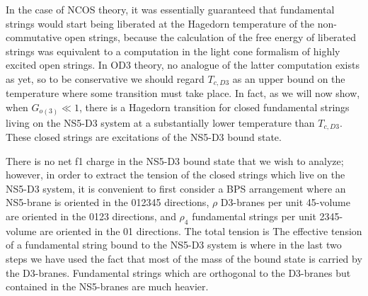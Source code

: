 In the case of NCOS theory, it was essentially guaranteed that
fundamental strings would start being liberated at the Hagedorn
temperature of the non-commutative open strings, because the
calculation of the free energy of liberated strings was equivalent to
a computation in the light cone formalism of highly excited open
strings.  In OD3 theory, no analogue of the latter computation exists
as yet, so to be conservative we should regard $T_{c,D3}$ as an upper
bound on the temperature where some transition must take place.  In
fact, as we will now show, when $G_{o(3)} \ll 1$, there is a Hagedorn
transition for closed fundamental strings living on the NS5-D3 system
at a substantially lower temperature than $T_{c,D3}$.  These closed
strings are excitations of the NS5-D3 bound state.  

There is no net f1 charge in the NS5-D3 bound state that we wish to
analyze; however, in order to extract the tension of the closed
strings which live on the NS5-D3 system, it is convenient to first
consider a BPS arrangement where an NS5-brane is oriented in the
012345 directions, $\rho$ D3-branes per unit 45-volume are oriented in
the 0123 directions, and $\rho_4$ fundamental strings per unit
2345-volume are oriented in the 01 directions.  The total tension is
 The effective tension of a fundamental string bound to the NS5-D3
system is
 where in the last two steps we have used the fact that most of the
mass of the bound state is carried by the D3-branes.  Fundamental
strings which are orthogonal to the D3-branes but contained in the
NS5-branes are much heavier.


